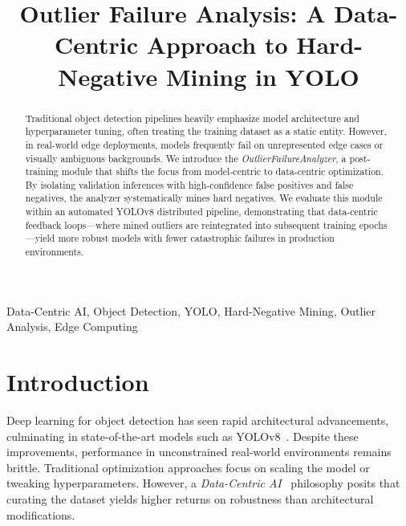 \documentclass[conference]{IEEEtran}
\begin{document}
\title{Outlier Failure Analysis: A Data-Centric Approach to Hard-Negative Mining in YOLO}

\author{
}

\maketitle

\begin{abstract}
Traditional object detection pipelines heavily emphasize model architecture and hyperparameter tuning, often treating the training dataset as a static entity. However, in real-world edge deployments, models frequently fail on unrepresented edge cases or visually ambiguous backgrounds. We introduce the \textit{OutlierFailureAnalyzer}, a post-training module that shifts the focus from model-centric to data-centric optimization. By isolating validation inferences with high-confidence false positives and false negatives, the analyzer systematically mines hard negatives. We evaluate this module within an automated YOLOv8 distributed pipeline, demonstrating that data-centric feedback loops—where mined outliers are reintegrated into subsequent training epochs—yield more robust models with fewer catastrophic failures in production environments.
\end{abstract}

\begin{IEEEkeywords}
Data-Centric AI, Object Detection, YOLO, Hard-Negative Mining, Outlier Analysis, Edge Computing
\end{IEEEkeywords}

\section{Introduction}
Deep learning for object detection has seen rapid architectural advancements, culminating in state-of-the-art models such as YOLOv8~\cite{redmon2016you, jocher2023yolo}. Despite these improvements, performance in unconstrained real-world environments remains brittle. Traditional optimization approaches focus on scaling the model or tweaking hyperparameters. However, a \textit{Data-Centric AI}~\cite{ng2021datacentric} philosophy posits that curating the dataset yields higher returns on robustness than architectural modifications.
\end{document}
